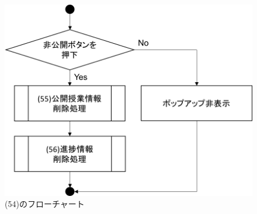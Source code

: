 \begin{figure}[htbp]
  \begin{center}
    \includegraphics[width=0.5\linewidth,clip]{./img/flow/54.png}
    \caption{(54)のフローチャート}\label{fig:54}
  \end{center}
\end{figure}

